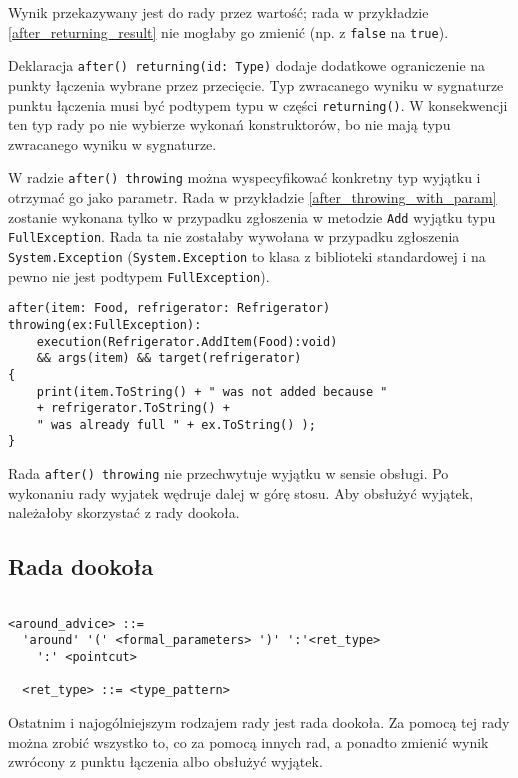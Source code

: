 \documentclass[a4paper,12pt]{mwbk}
\begin{document}
Wynik przekazywany jest do rady przez wartość; rada w przykładzie
\ref{after_returning_result} nie mogłaby go zmienić (np. z \lstinline!false! na
\lstinline!true!).

Deklaracja \lstinline!after() returning(id: Type)! dodaje dodatkowe
ograniczenie na punkty łączenia wybrane przez przecięcie. Typ zwracanego wyniku
w sygnaturze punktu łączenia musi być podtypem typu w części
\lstinline!returning()!. W konsekwencji ten typ rady po nie wybierze wykonań
konstruktorów, bo nie mają typu zwracanego wyniku w sygnaturze.

W radzie \lstinline!after() throwing! można wyspecyfikować konkretny typ
wyjątku i otrzymać go jako parametr.  Rada w przykładzie
\ref{after_throwing_with_param} zostanie wykonana tylko w przypadku zgłoszenia
w metodzie \lstinline!Add! wyjątku typu \lstinline!FullException!. Rada ta nie
zostałaby wywołana w przypadku zgłoszenia \lstinline!System.Exception!
(\lstinline!System.Exception! to klasa z biblioteki standardowej i na pewno nie
jest podtypem \lstinline!FullException!).

\begin{lstlisting}[style=AspectJ,caption=Dostęp do wyjątku,label=after_throwing_with_param]
after(item: Food, refrigerator: Refrigerator) 
throwing(ex:FullException):
    execution(Refrigerator.AddItem(Food):void) 
    && args(item) && target(refrigerator) 
{
    print(item.ToString() + " was not added because " 
    + refrigerator.ToString() +
    " was already full " + ex.ToString() );
}
\end{lstlisting}

Rada \lstinline!after() throwing! nie przechwytuje wyjątku w sensie obsługi. Po
wykonaniu rady wyjatek wędruje dalej w górę stosu. Aby obsłużyć wyjątek,
należałoby skorzystać z rady dookoła.


\subsection{Rada dookoła}

\begin{lstlisting}[style=grammar]

<around_advice> ::=
  'around' '(' <formal_parameters> ')' ':'<ret_type> 
    ':' <pointcut>

  <ret_type> ::= <type_pattern>
\end{lstlisting}

Ostatnim i najogólniejszym rodzajem rady jest rada dookoła. Za pomocą tej rady
można zrobić wszystko to, co za pomocą innych rad, a ponadto zmienić wynik
zwrócony z punktu łączenia albo obsłużyć wyjątek.
\end{document}
